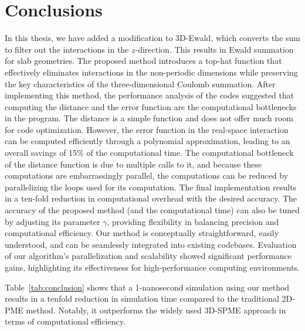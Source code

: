 \chapter{Conclusions}
\label{Chapter6}
In this thesis, we have added a modification to 3D-Ewald, which converts the sum to filter out the interactions in the $z$-direction. This results in Ewald summation for slab geometries. The proposed method introduces a top-hat function that effectively eliminates interactions in the non-periodic dimensions while preserving the key characteristics of the three-dimensional Coulomb summation. After implementing this method, the performance analysis of the codes suggested that computing the distance and the error function are the computational bottlenecks in the program. The distance is a simple function and does not offer much room for code optimization. However, the error function in the real-space interaction can be computed efficiently through a polynomial approximation, leading to an overall savings of 15\%  of the computational time. The computational bottleneck of the distance function is due to multiple calls to it, and because these computations are embarrassingly parallel, the computations can be reduced by parallelizing the loops used for its computation. The final implementation results in a ten-fold reduction in computational overhead with the desired accuracy. The accuracy of the proposed method (and the computational time) can also be tuned by adjusting its parameter $\gamma$, providing flexibility in balancing precision and computational efficiency. Our method is conceptually straightforward, easily understood, and can be seamlessly integrated into existing codebases. Evaluation of our algorithm’s parallelization and scalability showed significant performance gains, highlighting its effectiveness for high-performance computing environments. 



Table~\ref{tab:conclusion} shows that a 1-nanosecond simulation using our method results in a tenfold reduction in simulation time compared to the traditional 2D-PME method. Notably, it outperforms the widely used 3D-SPME approach in terms of computational efficiency. 

